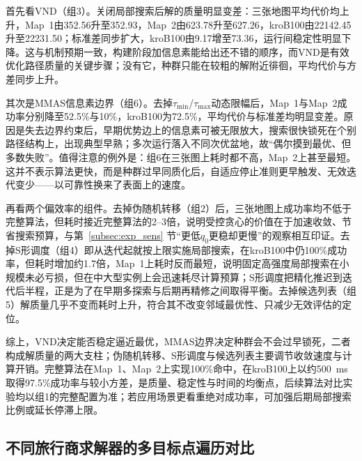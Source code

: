 \documentclass[lettersize,journal]{IEEEtran}
\begin{document}
首先看VND（组3）。关闭局部搜索后解的质量明显变差：三张地图平均代价均上升，Map~1由352.56升至352.93，Map~2由623.78升至627.26，kroB100由22142.45升至22231.50；标准差同步扩大，kroB100由9.17增至73.36，运行间稳定性明显下降。这与机制预期一致，构建阶段加信息素能给出还不错的顺序，而VND是有效优化路径质量的关键步骤；没有它，种群只能在较粗的解附近徘徊，平均代价与方差同步上升。

其次是MMAS信息素边界（组6）。去掉$\tau_{\min}$/$\tau_{\max}$动态限幅后，Map~1与Map~2成功率分别降至52.5\%与10\%，kroB100为72.5\%，平均代价与标准差均明显变差。原因是失去边界约束后，早期优势边上的信息素可被无限放大，搜索很快锁死在个别路径结构上，出现典型早熟；多次运行落入不同次优盆地，故“偶尔摸到最优、但多数失败”。值得注意的例外是：组6在三张图上耗时都不高，Map~2上甚至最短。这并不表示算法更快，而是种群过早同质化后，自适应停止准则更早触发、无效迭代变少——以可靠性换来了表面上的速度。

再看两个偏效率的组件。去掉伪随机转移（组2）后，三张地图上成功率均不低于完整算法，但耗时接近完整算法的2--3倍，说明受控贪心的价值在于加速收敛、节省搜索预算，与第~\textcolor{blue}{\ref{subsec:exp_sens}} 节“更低$q_0$更稳却更慢”的观察相互印证。去掉S形调度（组4）即从迭代起就按上限实施局部搜索，在kroB100中仍100\%成功率，但耗时增加约1.7倍，Map~1上耗时反而最短，说明固定高强度局部搜索在小规模未必亏损，但在中大型实例上会迅速耗尽计算预算；S形调度把精化推迟到迭代后半程，正是为了在早期多探索与后期再精修之间取得平衡。去掉候选列表（组5）解质量几乎不变而耗时上升，符合其不改变邻域最优性、只减少无效评估的定位。

综上，VND决定能否稳定逼近最优，MMAS边界决定种群会不会过早锁死，二者构成解质量的两大支柱；伪随机转移、S形调度与候选列表主要调节收敛速度与计算开销。完整算法在Map~1、Map~2上实现100\%命中，在kroB100上以约500~ms取得97.5\%成功率与较小方差，是质量、稳定性与时间的均衡点，后续算法对比实验均以组1的完整配置为准；若应用场景更看重绝对成功率，可加强后期局部搜索比例或延长停滞上限。


\subsection{不同旅行商求解器的多目标点遍历对比}

\label{subsec:exp_cmp}
\end{document}
